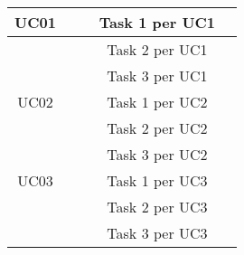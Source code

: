 \documentclass{article}
\begin{document}
\begin{itemize}
\begin{tabular}{ |c|c|c|c|c| }
            \hline
            UC01           &                     &               &   Task 1 per UC1   &               \\
            \hline
                           &                     &               &   Task 2 per UC1   &               \\
            \hline
                           &                     &               &   Task 3 per UC1   &               \\
            \hline
            UC02           &                     &               &   Task 1 per UC2   &               \\
            \hline
                           &                     &               &   Task 2 per UC2   &               \\
            \hline
                           &                     &               &   Task 3 per UC2   &               \\
            \hline
            UC03           &                     &               &   Task 1 per UC3   &               \\
            \hline
                           &                     &               &   Task 2 per UC3   &               \\
            \hline
                           &                     &               &   Task 3 per UC3   &               \\
            \hline
        \end{tabular}
    \end{itemize}
\end{document}
